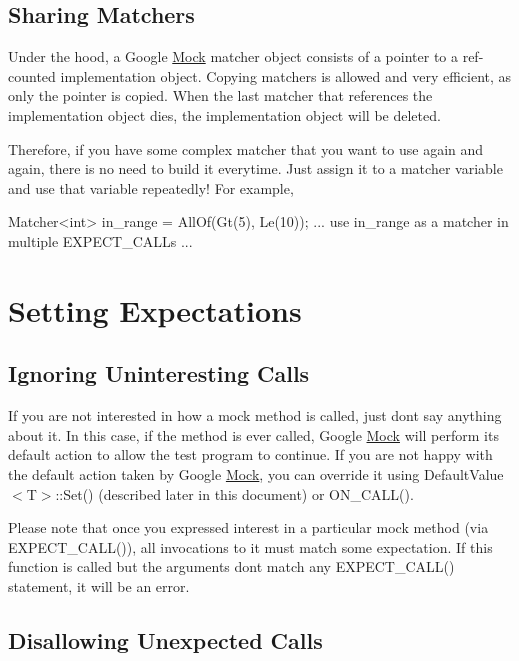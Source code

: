 \subsection*{Sharing Matchers}

Under the hood, a Google \hyperlink{class_mock}{Mock} matcher object consists of a pointer to a ref-\/counted implementation object. Copying matchers is allowed and very efficient, as only the pointer is copied. When the last matcher that references the implementation object dies, the implementation object will be deleted.

Therefore, if you have some complex matcher that you want to use again and again, there is no need to build it everytime. Just assign it to a matcher variable and use that variable repeatedly! For example,


\begin{DoxyCode}
Matcher<int> in\_range = AllOf(Gt(5), Le(10));
... use in\_range as a matcher in multiple EXPECT\_CALLs ...
\end{DoxyCode}


\section*{Setting Expectations}

\subsection*{Ignoring Uninteresting Calls}

If you are not interested in how a mock method is called, just don\textquotesingle{}t say anything about it. In this case, if the method is ever called, Google \hyperlink{class_mock}{Mock} will perform its default action to allow the test program to continue. If you are not happy with the default action taken by Google \hyperlink{class_mock}{Mock}, you can override it using {\ttfamily Default\+Value$<$T$>$\+::\+Set()} (described later in this document) or {\ttfamily O\+N\+\_\+\+C\+A\+L\+L()}.

Please note that once you expressed interest in a particular mock method (via {\ttfamily E\+X\+P\+E\+C\+T\+\_\+\+C\+A\+L\+L()}), all invocations to it must match some expectation. If this function is called but the arguments don\textquotesingle{}t match any {\ttfamily E\+X\+P\+E\+C\+T\+\_\+\+C\+A\+L\+L()} statement, it will be an error.

\subsection*{Disallowing Unexpected Calls}

